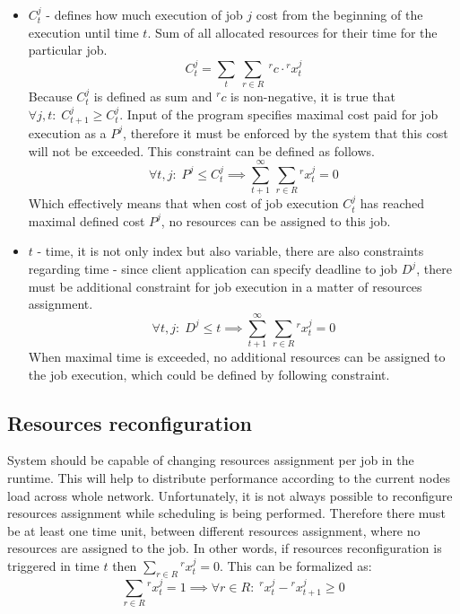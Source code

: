 \begin{itemize}
	\item $C_{t}^{j}$ - defines how much execution of job $j$ cost from the beginning of the execution until time $t$.
	      Sum of all allocated resources for their time for the particular job.
	      \begin{equation}
	      	C_{t}^{j} = \sum_{t}\:\sum_{r \in R}\: {}^{r}c \cdot {}^{r}x_{t}^{j} 
	      \end{equation}
	      Because $C_{t}^{j}$ is defined as sum and ${}^{r}c$ is non-negative,
	      it is true that $\forall j, t:\; C_{t+1}^{j} \geq C_{t}^{j}$.
	      Input of the program specifies maximal cost paid for job execution as a $P^j$, 
	      therefore it must be enforced by the system that this cost will not be exceeded.
	      This constraint can be defined as follows.
	      \begin{equation}
	      	\forall t, j:\; P^{j} \leq C_{t}^{j} \implies \sum_{t+1}^{\infty} \, \sum_{r \in R} {}^{r}x_{t}^{j} = 0 
	      \end{equation}
	      Which effectively means that when cost of job execution $C_{t}^{j}$ has reached maximal defined cost $P^{j}$,
	      no resources can be assigned to this job.
	\item $t$ - time, it is not only index but also variable, there are also constraints regarding time -
	      since client application can specify deadline to job $D^{j}$,
	      there must be additional constraint for job execution in a matter of resources assignment.
	      \begin{equation}
	      	\forall t, j:\; D^{j} \leq t \implies \sum_{t+1}^{\infty} \, \sum_{r \in R} {}^{r}x_{t}^{j} = 0 
	      \end{equation}
	      When maximal time is exceeded, no additional resources can be assigned to the job execution, 
	      which could be defined by following constraint.
\end{itemize}

\subsection{Resources reconfiguration}\label{subsec:resource-config}
System should be capable of changing resources assignment per job in the runtime.
This will help to distribute performance according to the current nodes load across whole network.
Unfortunately, it is not always possible to reconfigure resources assignment while scheduling is being performed.
Therefore there must be at least one time unit, between different resources assignment,
where no resources are assigned to the job.
In other words, if resources reconfiguration is triggered in time $t$ then $\sum_{r \in R} {}^{r}x_{t}^{j} = 0$.
This can be formalized as:
\begin{equation}
	\sum_{r \in R} {}^{r}x_{t}^{j} = 1 \implies \forall r \in R:\; {}^{r}x_{t}^{j} - {}^{r}x_{t + 1}^{j} \geq 0
\end{equation}

